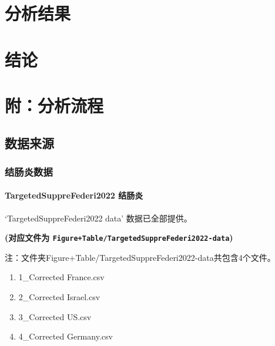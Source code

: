 \documentclass[
]{article}
\providecommand{\tightlist}{%
  \setlength{\itemsep}{0pt}\setlength{\parskip}{0pt}}
\begin{document}
\hypertarget{results}{%
\section{分析结果}\label{results}}

\hypertarget{dis}{%
\section{结论}\label{dis}}

\hypertarget{workflow}{%
\section{附：分析流程}\label{workflow}}

\hypertarget{ux6570ux636eux6765ux6e90}{%
\subsection{数据来源}\label{ux6570ux636eux6765ux6e90}}

\hypertarget{ux7ed3ux80a0ux708eux6570ux636e}{%
\subsubsection{结肠炎数据}\label{ux7ed3ux80a0ux708eux6570ux636e}}

\hypertarget{main1}{%
\paragraph{TargetedSuppreFederi2022 结肠炎}\label{main1}}

`TargetedSuppreFederi2022 data' 数据已全部提供。

\textbf{(对应文件为 \texttt{Figure+Table/TargetedSuppreFederi2022-data})}

\begin{center}\begin{tcolorbox}[colback=gray!10, colframe=gray!50, width=0.9\linewidth, arc=1mm, boxrule=0.5pt]注：文件夹Figure+Table/TargetedSuppreFederi2022-data共包含4个文件。

\begin{enumerate}\tightlist
\item 1\_Corrected France.csv
\item 2\_Corrected Israel.csv
\item 3\_Corrected US.csv
\item 4\_Corrected Germany.csv
\end{enumerate}\end{tcolorbox}
\end{center}
\end{document}
